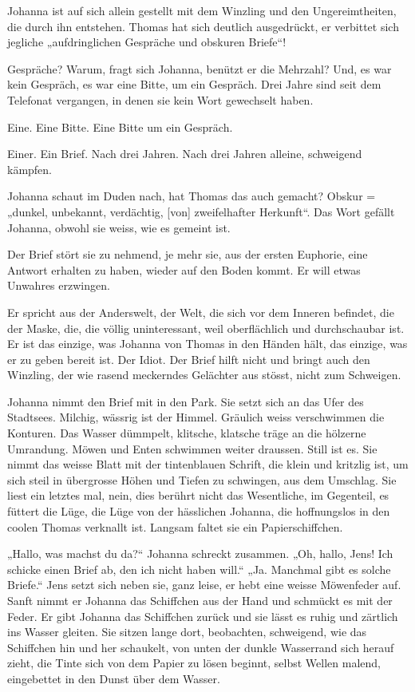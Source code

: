 \documentclass[10pt,titlepage,a5paper]{book}
\begin{document}
Johanna ist auf sich allein gestellt mit dem Winzling und den Ungereimtheiten, die durch ihn entstehen. Thomas hat sich deutlich ausgedrückt, er verbittet sich jegliche „aufdringlichen Gespräche und obskuren Briefe“! 

Gespräche? Warum, fragt sich Johanna, benützt er die Mehrzahl? Und, es war kein Gespräch, es war eine Bitte, um ein Gespräch. Drei Jahre sind seit dem Telefonat vergangen, in denen sie kein Wort gewechselt haben. 

Eine. Eine Bitte. Eine Bitte um ein Gespräch.

 Einer. Ein Brief. Nach drei Jahren. Nach drei Jahren alleine, schweigend kämpfen.

Johanna schaut im Duden nach, hat Thomas das auch gemacht? Obskur =  „dunkel, unbekannt, verdächtig, [von] zweifelhafter Herkunft“. Das Wort gefällt Johanna, obwohl sie weiss, wie es gemeint ist.

Der Brief stört sie zu nehmend, je mehr sie, aus der ersten Euphorie, eine Antwort erhalten zu haben, wieder auf den Boden kommt. Er will etwas Unwahres erzwingen. 

Er spricht aus der Anderswelt, der Welt, die sich vor dem Inneren befindet, die der Maske, die, die völlig uninteressant, weil oberflächlich und durchschaubar ist. Er ist das einzige, was Johanna von Thomas in den Händen hält, das einzige, was er zu geben bereit ist. Der Idiot. Der Brief hilft nicht und bringt auch den Winzling, der wie rasend meckerndes Gelächter aus stösst, nicht zum Schweigen.

Johanna nimmt den Brief mit in den Park. Sie setzt sich an das Ufer des Stadtsees. Milchig, wässrig ist der Himmel. Gräulich weiss verschwimmen die Konturen. Das Wasser dümmpelt, klitsche, klatsche träge an die hölzerne Umrandung. Möwen und Enten schwimmen weiter draussen. Still ist es. Sie nimmt das weisse Blatt mit der tintenblauen Schrift, die klein und kritzlig ist, um sich steil in übergrosse Höhen und Tiefen zu schwingen, aus dem Umschlag. Sie liest ein letztes mal, nein, dies berührt nicht das Wesentliche, im Gegenteil, es füttert die Lüge, die Lüge von der hässlichen Johanna, die hoffnungslos in den coolen Thomas verknallt ist. Langsam faltet sie ein Papierschiffchen. 

„Hallo, was machst du da?“ Johanna schreckt zusammen. „Oh, hallo, Jens! Ich schicke einen Brief ab, den ich nicht haben will.“ „Ja. Manchmal gibt es solche Briefe.“ Jens setzt sich neben sie, ganz leise, er hebt eine weisse Möwenfeder auf. Sanft nimmt er Johanna das Schiffchen aus der Hand und schmückt es mit der Feder. Er gibt Johanna das Schiffchen zurück und sie lässt es ruhig und zärtlich ins Wasser gleiten. Sie sitzen lange dort, beobachten, schweigend, wie das Schiffchen hin und her schaukelt, von unten der dunkle Wasserrand sich herauf zieht, die Tinte sich von dem Papier zu lösen beginnt, selbst Wellen malend, eingebettet in den Dunst über dem Wasser.
\end{document}
